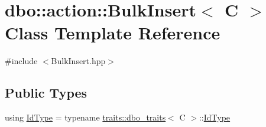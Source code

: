 \hypertarget{classdbo_1_1action_1_1_bulk_insert}{\section{dbo\+:\+:action\+:\+:Bulk\+Insert$<$ C $>$ Class Template Reference}
\label{classdbo_1_1action_1_1_bulk_insert}
}


{\ttfamily \#include $<$Bulk\+Insert.\+hpp$>$}

\subsection*{Public Types}
\begin{DoxyCompactItemize}
\item 
using \hyperlink{classdbo_1_1action_1_1_bulk_insert_a938dbd272f73f38b26415014b0a37aa6}{Id\+Type} = typename \hyperlink{structdbo_1_1traits_1_1dbo__traits}{traits\+::dbo\+\_\+traits}$<$ C $>$\+::\hyperlink{classdbo_1_1action_1_1_bulk_insert_a938dbd272f73f38b26415014b0a37aa6}{Id\+Type}
\end{DoxyCompactItemize}
